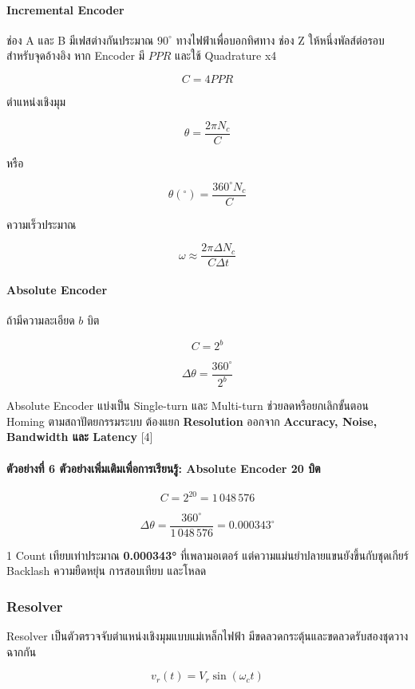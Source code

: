 \paragraph{Incremental Encoder}

ช่อง A และ B มีเฟสต่างกันประมาณ $90^\circ$ ทางไฟฟ้าเพื่อบอกทิศทาง ช่อง Z ให้หนึ่งพัลส์ต่อรอบสำหรับจุดอ้างอิง หาก Encoder มี $PPR$ และใช้ Quadrature x4

\[
C=4PPR
\]

ตำแหน่งเชิงมุม

\[
\theta=\frac{2\pi N_c}{C}
\]

หรือ

\[
\theta(^\circ)=\frac{360^\circ N_c}{C}
\]

ความเร็วประมาณ

\[
\omega \approx
\frac{2\pi \Delta N_c}{C\Delta t}
\]

\paragraph{Absolute Encoder}

ถ้ามีความละเอียด $b$ บิต

\[
C=2^b
\]

\[
\Delta\theta=\frac{360^\circ}{2^b}
\]

Absolute Encoder แบ่งเป็น Single-turn และ Multi-turn ช่วยลดหรือยกเลิกขั้นตอน Homing ตามสถาปัตยกรรมระบบ ต้องแยก \textbf{Resolution} ออกจาก \textbf{Accuracy, Noise, Bandwidth และ Latency} [4]

\paragraph{ตัวอย่างที่ 6 ตัวอย่างเพิ่มเติมเพื่อการเรียนรู้: Absolute Encoder 20 บิต}

\[
C=2^{20}=1\,048\,576
\]

\[
\Delta\theta=\frac{360^\circ}{1\,048\,576}=0.000343^\circ
\]

1 Count เทียบเท่าประมาณ \textbf{0.000343°} ที่เพลามอเตอร์ แต่ความแม่นยำปลายแขนยังขึ้นกับชุดเกียร์ Backlash ความยืดหยุ่น การสอบเทียบ และโหลด

\subsubsection{Resolver}

Resolver เป็นตัวตรวจจับตำแหน่งเชิงมุมแบบแม่เหล็กไฟฟ้า มีขดลวดกระตุ้นและขดลวดรับสองชุดวางฉากกัน

\[
v_r(t)=V_r\sin(\omega_ct)
\]

